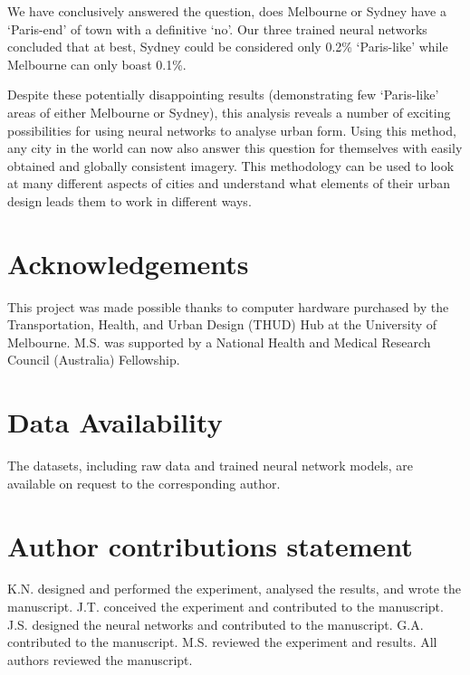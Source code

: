 \documentclass[10pt,letterpaper]{article}
\begin{document}
We have conclusively answered the question, does Melbourne or Sydney have a `Paris-end' of town with a definitive `no'. Our three trained neural networks concluded that at best, Sydney could be considered only 0.2\% `Paris-like' while Melbourne can only boast 0.1\%.   

Despite these potentially disappointing results (demonstrating few `Paris-like' areas of either Melbourne or Sydney), this analysis reveals a number of exciting possibilities for using neural networks to analyse urban form. Using this method, any city in the world can now also answer this question for themselves with easily obtained and globally consistent imagery. This methodology can be used to look at many different aspects of cities and understand what elements of their urban design leads them to work in different ways.




\section*{Acknowledgements}
This project was made possible thanks to computer hardware purchased by the Transportation, Health, and Urban Design (THUD) Hub at the University of Melbourne. M.S. was supported by a National Health and Medical Research Council (Australia) Fellowship.

\section*{Data Availability}\label{sec:methods6} 
The datasets, including raw data and trained neural network models, are available on request to the corresponding author.

\section*{Author contributions statement}

K.N. designed and performed the experiment, analysed the results, and wrote the manuscript. J.T. conceived the experiment and contributed to the manuscript. J.S. designed the neural networks and contributed to the manuscript. G.A. contributed to the manuscript. M.S. reviewed the experiment and results. All authors reviewed the manuscript. 


\nolinenumbers

%
%
% 
\begin{thebibliography}{}

% 
% 



\end{thebibliography}
\end{document}

